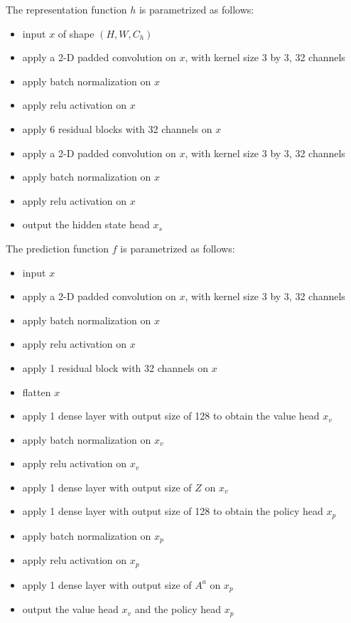 The representation function $h$ is parametrized as follows:
\begin{itemize}
    \item input $x$ of shape $(H, W, C_h)$
    \item apply a 2-D padded convolution on $x$, with kernel size 3 by 3, 32 channels
    \item apply batch normalization on $x$
    \item apply relu activation on $x$
    \item apply 6 residual blocks with 32 channels on $x$
    \item apply a 2-D padded convolution on $x$, with kernel size 3 by 3, 32 channels
    \item apply batch normalization on $x$
    \item apply relu activation on $x$
    \item output the hidden state head $x_s$ %
\end{itemize}

The prediction function $f$ is parametrized as follows:
\begin{itemize}
    \item input $x$ %
    \item apply a 2-D padded convolution on $x$, with kernel size 3 by 3, 32 channels
    \item apply batch normalization on $x$
    \item apply relu activation on $x$
    \item apply 1 residual block with 32 channels on $x$
    \item flatten $x$
    \item apply 1 dense layer with output size of 128 to obtain the value head $x_v$
    \item apply batch normalization on $x_v$
    \item apply relu activation on $x_v$
    \item apply 1 dense layer with output size of $Z$ on $x_v$
    \item apply 1 dense layer with output size of 128 to obtain the policy head $x_p$
    \item apply batch normalization on $x_p$
    \item apply relu activation on $x_p$
    \item apply 1 dense layer with output size of $A^a$ on $x_p$
    \item output the value head $x_v$ and the policy head $x_p$
\end{itemize}

